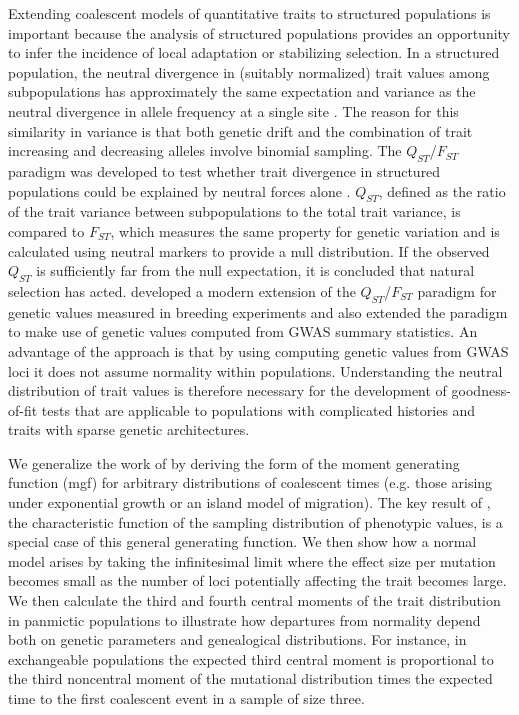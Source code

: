 Extending coalescent models of quantitative traits to structured populations is
important because the analysis of structured populations provides an opportunity
to infer the incidence of local adaptation or stabilizing selection. In a
structured population, the neutral divergence in (suitably normalized) trait
values among subpopulations has approximately the same expectation and variance
as the neutral divergence in allele frequency at a single
site \citep{Rogers1983,Whitlock2008}. The reason for this similarity in variance
is that both genetic drift and the combination of trait increasing and
decreasing alleles involve binomial sampling. The $Q_{ST}$/$F_{ST}$ paradigm was
developed to test whether trait divergence in structured populations could be
explained by neutral forces alone \citep{Spitze1993,Whitlock2008,Leinonen2013}.
$Q_{ST}$, defined as the ratio of the trait variance between subpopulations to
the total trait variance, is compared to $F_{ST}$, which measures the same
property for genetic variation and is calculated using neutral markers to
provide a null distribution. If the observed $Q_{ST}$ is sufficiently far from
the null expectation, it is concluded that natural selection has
acted. \citet{Ovaskainen2011} developed a modern extension of the
$Q_{ST}$/$F_{ST}$ paradigm for genetic values measured in breeding experiments
and \citet{Berg2014} also extended the paradigm to make use of genetic values
computed from GWAS summary statistics. An advantage of the
\citet{Berg2014} approach is that by using computing genetic values from GWAS
loci it does not assume normality within populations. Understanding the neutral
distribution of trait values is therefore necessary for the development of
goodness-of-fit tests that are applicable to populations with complicated
histories and traits with sparse genetic architectures.

We generalize the work of \citet{Schraiber2015} by deriving the form of the
moment generating function (mgf) for arbitrary distributions of coalescent times
(e.g. those arising under exponential growth or an island model of migration).
The key result of \citet{Schraiber2015}, the characteristic function of the
sampling distribution of phenotypic values, is a special case of this general
generating function. We then show how a normal model arises by taking the
infinitesimal limit where the effect size per mutation becomes small as the
number of loci potentially affecting the trait becomes large. We then calculate
the third and fourth central moments of the trait distribution in panmictic
populations to illustrate how departures from normality depend both on genetic
parameters and genealogical distributions. For instance, in exchangeable
populations the expected third central moment is proportional to the third
noncentral moment of the mutational distribution times the expected time to the
first coalescent event in a sample of size three.

